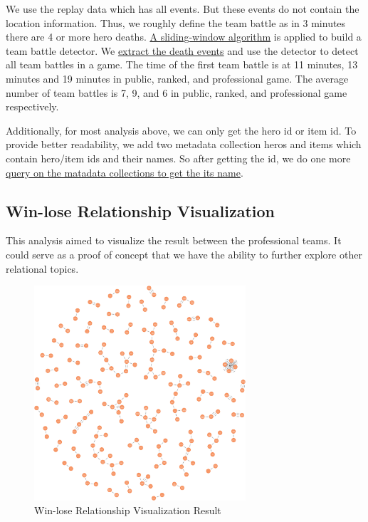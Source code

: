 \documentclass{article}
\begin{document}
We use the replay data which has all events. But these events do not contain the location information. Thus, we roughly define the team battle as in 3 minutes there are 4 or more hero deaths. \href{https://github.com/Vopaaz/big-data-psg-lgd/blob/master/src/main/scala/TeamBattleDetector.scala#L61-L78}{A sliding-window algorithm} is applied to build a team battle detector. We \href{https://github.com/Vopaaz/big-data-psg-lgd/blob/master/src/main/scala/TeamBattleDetector.scala#L33-L36}{extract the death events} and use the detector to detect all team battles in a game. The time of the first team battle is at 11 minutes, 13 minutes and 19 minutes in public, ranked, and professional game. The average number of team battles is 7, 9, and 6 in public, ranked, and professional game respectively.

Additionally, for most analysis above, we can only get the hero id or item id. To provide better readability, we add two metadata collection heros and items which contain hero/item ids and their names. So after getting the id, we do one more \href{https://github.com/Vopaaz/big-data-psg-lgd/blob/master/src/main/scala/Spark/SparkMongoHelper.scala#L15-L29}{query on the matadata collections to get the its name}.

\subsection{Win-lose Relationship Visualization}

This analysis aimed to visualize the result between the professional teams.
It could serve as a proof of concept that we have the ability to further explore other relational topics.

\begin{figure}[H]
\centering
\includegraphics[width=0.7\textwidth]{pic/win-lose-viz.png}
\caption{Win-lose Relationship Visualization Result}
\label{win-lose-relationship-visualization-result}
\end{figure}
\end{document}
